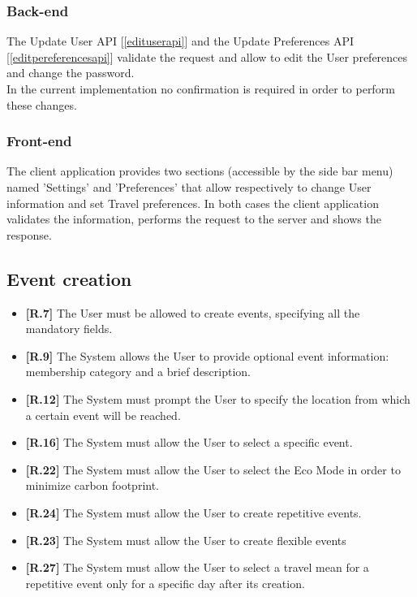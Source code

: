 \subsubsection*{Back-end}
The Update User API [\ref{edituserapi}] and the Update Preferences API [\ref{editpereferencesapi}] validate the request and allow to edit the User preferences and change the password.\\
In the current implementation no confirmation is required in order to perform these changes.

\subsubsection*{Front-end}
The client application provides two sections (accessible by the side bar menu) named 'Settings' and 'Preferences' that allow respectively to change User information and set Travel preferences. In both cases the client application validates the information, performs the request to the server and shows the response.

\subsection{Event creation}
\begin{itemize}
\item {\color{OliveGreen}\textbf{[R.7]}} The User must be allowed to create events, specifying all the mandatory fields.
\item {\color{OliveGreen}\textbf{[R.9]}} The System allows the User to provide optional event information: membership category and a brief description. 
\item {\color{OliveGreen}\textbf{[R.12]}} The System must prompt the User to specify the location from which a certain event will be reached. 
\item {\color{OliveGreen}\textbf{[R.16]}} The System must allow the User to select a specific event.
\item {\color{OliveGreen}\textbf{[R.22]}} The System must allow the User to select the Eco Mode in order to minimize carbon footprint.
\item {\color{OliveGreen}\textbf{[R.24]}} The System must allow the User to create repetitive events. 
\item {\color{OliveGreen}\textbf{[R.23]}} The System must allow the User to create flexible events 
\item {\color{red}\textbf{[R.27]}} The System must allow the User to select a travel mean for a repetitive event only for a specific day after its creation.
\end{itemize}

